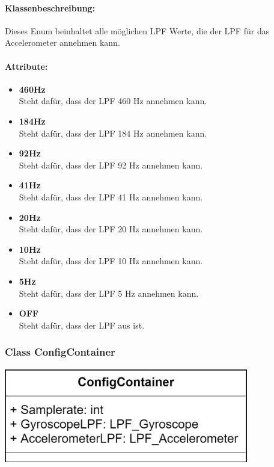 \documentclass[a4paper,12pt]{article}
\begin{document}
\paragraph{Klassenbeschreibung:}
Dieses Enum beinhaltet alle möglichen LPF Werte, die der LPF für das Accelerometer annehmen kann.

\paragraph{Attribute:}
\begin{itemize}
	\item \textbf{460Hz}\\Steht dafür, dass der LPF 460 Hz annehmen kann.
	\item \textbf{184Hz}\\Steht dafür, dass der LPF 184 Hz annehmen kann.
	\item \textbf{92Hz}\\Steht dafür, dass der LPF 92 Hz annehmen kann.
	\item \textbf{41Hz}\\Steht dafür, dass der LPF 41 Hz annehmen kann.
	\item \textbf{20Hz}\\Steht dafür, dass der LPF 20 Hz annehmen kann.
	\item \textbf{10Hz}\\Steht dafür, dass der LPF 10 Hz annehmen kann.
	\item \textbf{5Hz}\\Steht dafür, dass der LPF 5 Hz annehmen kann.
	\item \textbf{OFF}\\Steht dafür, dass der LPF aus ist.\\
\end{itemize}



\begin{minipage}[b]{0.5\textwidth}
	\subsubsection{Class ConfigContainer}
	
	\end{minipage}
	\begin{minipage}[c]{0.5\textwidth}
	\includegraphics[width=0.8\textwidth]{bilder/BibPackageKlassen/ConfigContainer.png}
\end{minipage}
\end{document}
